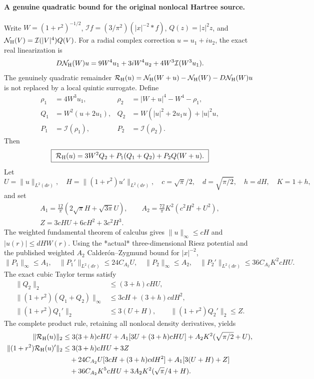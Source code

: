 \documentclass[11pt]{amsart}
\begin{document}
\paragraph{A genuine quadratic bound for the original nonlocal Hartree source.}
Write \(W=(1+r^2)^{-1/2}\),
\(\mathcal If=(3/\pi^2)(|x|^{-2}*f)\),
\(Q(z)=|z|^2z\), and
\(\mathcal N_{\rm H}(V)=\mathcal I(|V|^4)Q(V)\).
For a radial complex correction \(u=u_1+iu_2\),
the exact real linearization is
\[
 D\mathcal N_{\rm H}(W)u
   =9W^4u_1+3iW^4u_2+
     4W^3\mathcal I(W^3u_1).
\]
The genuinely quadratic remainder
\(\mathcal R_{\rm H}(u)
 =\mathcal N_{\rm H}(W+u)-\mathcal N_{\rm H}(W)
-D\mathcal N_{\rm H}(W)u\) is not replaced by a local quintic
surrogate. Define
\[
 \begin{aligned}
 \rho_1&=4W^3u_1,&
 \rho_2&=|W+u|^4-W^4-\rho_1,\\
 Q_1&=W^2(u+2u_1),&
 Q_2&=W(|u|^2+2u_1u)+|u|^2u,\\
 P_1&=\mathcal I(\rho_1),&
 P_2&=\mathcal I(\rho_2).
 \end{aligned}
\]
Then
\[
 \boxed{\ 
 \mathcal R_{\rm H}(u)
 =3W^2Q_2+P_1(Q_1+Q_2)+P_2Q(W+u).
 \ }
\]
Let
\[
 U=\|u\|_{L^2(dr)},\quad
 H=\|(1+r^2)u'\|_{L^2(dr)},\quad
 c=\sqrt\pi/2,\quad d=\sqrt{\pi/2},\quad
 h=dH,\quad K=1+h,
\]
and set
\[
 \begin{gathered}
 A_1=\frac{12}{\pi}
    (2\sqrt\pi H+\sqrt{3\pi}U),\qquad
 A_2=\frac{72}{\pi}K^2(c^2H^2+U^2),\\
 Z=3cHU+6cH^2+3c^2H^3.
 \end{gathered}
\]
The weighted fundamental theorem of calculus gives
\(\|u\|_\infty\le cH\) and
\(|u(r)|\le dHW(r)\). Using the *actual* three-dimensional
Riesz potential and the published weighted \(A_2\)
Calderón--Zygmund bound for \(|x|^{-2}\),
\[
 \|P_1\|_\infty\le A_1,\quad
 \|P_1'\|_{L^2(dr)}\le24C_{A_2}U,\quad
 \|P_2\|_\infty\le A_2,\quad
 \|P_2'\|_{L^2(dr)}
   \le36C_{A_2}K^2cHU.
\]
The exact cubic Taylor terms satisfy
\[
 \begin{aligned}
 \|Q_2\|_2&\le(3+h)cHU,\\
 \|(1+r^2)(Q_1+Q_2)\|_\infty
 &\le3cH+(3+h)cdH^2,\\
 \|(1+r^2)Q_1'\|_2&\le3(U+H),\qquad
 \|(1+r^2)Q_2'\|_2\le Z .
 \end{aligned}
\]
The complete product rule, retaining all nonlocal
density derivatives, yields
\[
 \begin{aligned}
 \|\mathcal R_{\rm H}(u)\|_2
 &\le 3(3+h)cHU+
 A_1[3U+(3+h)cHU]+
 A_2K^2(\sqrt{\pi/2}+U),\\
 \|(1+r^2)\mathcal R_{\rm H}(u)'\|_2
 &\le3(3+h)cHU+3Z\\
 &\quad+24C_{A_2}U[3cH+(3+h)cdH^2]
       +A_1[3(U+H)+Z]\\
 &\quad+36C_{A_2}K^5cHU+
       3A_2K^2(\sqrt\pi/4+H).
 \end{aligned}
\]
\end{document}
